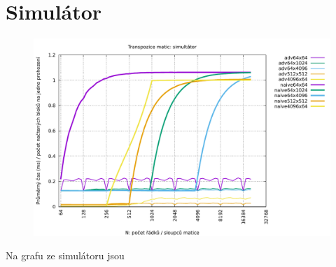 \documentclass[12pt,a4paper]{report}
\begin{document}
	\section{Simulátor}
	\begin{figure}[h]	
	\centering	
	\includegraphics[scale=0.6]{graph_2}		
	\end{figure}

	Na grafu ze simulátoru jsou 

	\begin{figure}[h]	
    \centering
		\qquad
    \end{figure}
\end{document}
